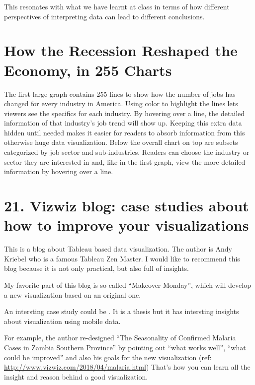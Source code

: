 \documentclass[]{book}
\theoremstyle{definition}
\theoremstyle{definition}
\theoremstyle{definition}
\theoremstyle{remark}
\begin{document}
This resonates with what we have learnt at class in terms of how
different perspectives of interpreting data can lead to different
conclusions.

\section{How the Recession Reshaped the Economy, in 255
Charts}\label{how-the-recession-reshaped-the-economy-in-255-charts}

\citep{recession_economy}

The first large graph contains 255 lines to show how the number of jobs
has changed for every industry in America. Using color to highlight the
lines lets viewers see the specifics for each industry. By hovering over
a line, the detailed information of that industry's job trend will show
up. Keeping this extra data hidden until needed makes it easier for
readers to absorb information from this otherwise huge data
visualization. Below the overall chart on top are subsets categorized by
job sector and sub-industries. Readers can choose the industry or sector
they are interested in and, like in the first graph, view the more
detailed information by hovering over a line.

\section{21. Vizwiz blog: case studies about how to improve your
visualizations}\label{vizwiz-blog-case-studies-about-how-to-improve-your-visualizations}

This is a blog about Tableau based data visualization. The author is
Andy Kriebel who is a famous Tableau Zen Master. I would like to
recommend this blog because it is not only practical, but also full of
insights.

My favorite part of this blog is so called ``Makeover Monday'', which
will develop a new visualization based on an original one.

An intersting case study could be \citep{case_thesis}. It is a thesis
but it has intersting insights about visualization using mobile data.

For example, the author re-designed ``The Seasonality of Confirmed
Malaria Cases in Zambia Southern Province'' by pointing out ``what works
well'', ``what could be improved'' and also his goals for the new
visualization (ref: \url{http://www.vizwiz.com/2018/04/malaria.html})
That's how you can learn all the insight and reason behind a good
visualization. \citep{vizwiz_malaria}
\end{document}
